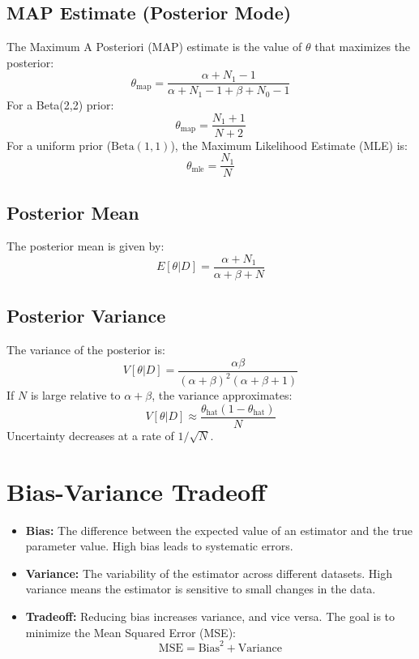 \documentclass{article}
\begin{document}
\subsection*{MAP Estimate (Posterior Mode)}

The Maximum A Posteriori (MAP) estimate is the value of $\theta$ that maximizes the posterior:
\[
\theta_{\text{map}} = \frac{\alpha + N_1 - 1}{\alpha + N_1 - 1 + \beta + N_0 - 1}
\]
For a Beta(2,2) prior:
\[
\theta_{\text{map}} = \frac{N_1 + 1}{N + 2}
\]
For a uniform prior ($\text{Beta}(1,1)$), the Maximum Likelihood Estimate (MLE) is:
\[
\theta_{\text{mle}} = \frac{N_1}{N}
\]

\subsection*{Posterior Mean}

The posterior mean is given by:
\[
E[\theta | D] = \frac{\alpha + N_1}{\alpha + \beta + N}
\]

\subsection*{Posterior Variance}

The variance of the posterior is:
\[
V[\theta | D] = \frac{\alpha \beta}{(\alpha + \beta)^2 (\alpha + \beta + 1)}
\]
If $N$ is large relative to $\alpha + \beta$, the variance approximates:
\[
V[\theta | D] \approx \frac{\theta_{\text{hat}}(1 - \theta_{\text{hat}})}{N}
\]
Uncertainty decreases at a rate of $1/\sqrt{N}$.

\section*{Bias-Variance Tradeoff}

\begin{itemize}
    \item \textbf{Bias:} The difference between the expected value of an estimator and the true parameter value. High bias leads to systematic errors.
    \item \textbf{Variance:} The variability of the estimator across different datasets. High variance means the estimator is sensitive to small changes in the data.
    \item \textbf{Tradeoff:} Reducing bias increases variance, and vice versa. The goal is to minimize the Mean Squared Error (MSE):
    \[
    \text{MSE} = \text{Bias}^2 + \text{Variance}
    \]
\end{itemize}
\end{document}

